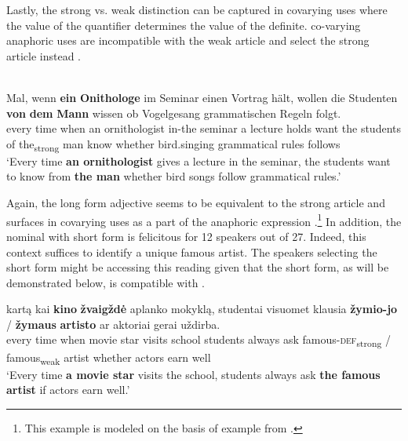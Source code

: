 \documentclass[output=paper,
modfonts
]{langscibook}
\begin{document}
Lastly, the strong vs. weak distinction can be captured in covarying uses where the value of the quantifier determines the value of the definite.  co-varying anaphoric uses are incompatible with the weak article and select the strong article instead . 

\begin{exe}
	\ex \label{ex:sereikaite:43}
	 \citep[33]{Schwarz2009} \\
	 {Mal}, {wenn} {\textbf{ein}} {\textbf{Onithologe}} {im} {Seminar} {einen} {Vortrag} {h\"alt}, {wollen} {die} {Studenten} \textbf{von} \textbf{dem} {\textbf{Mann}} {wissen} {ob} {Vogelgesang} {grammatischen} {Regeln} {folgt}. \\
	every time when {an} {ornithologist} in-the seminar a lecture holds want the students {of} {the\textsubscript{strong}} {man} know whether bird.singing grammatical rules follows\\
	\trans `Every time \textbf{an ornithologist} gives a lecture in the seminar, the students want to know from \textbf{the man} whether bird songs follow grammatical rules.' 
\end{exe}

Again, the long form adjective seems to be equivalent to the  strong article and surfaces in covarying uses as a part of the anaphoric expression .\footnote{This example is modeled on the basis of  example from .} In addition, the nominal with short form is felicitous for 12 speakers out of 27. Indeed, this context suffices to identify a unique famous artist. The speakers selecting the short form might be accessing this reading given that the short form, as will be demonstrated below, is compatible with .


\begin{exe}
	\ex \label{ex:sereikaite:44}
	 {kartą} {kai} \textbf{{kino}} \textbf{{žvaigždė}} {aplanko} {mokyklą}, {studentai} {visuomet} {klausia} \textbf{žymio-jo} \textnormal{/} \textbf{žymaus} \textbf{{artisto}} {ar} {aktoriai} {gerai} {uždirba}. \\
	every time when {movie} {star} visits school students always ask {famous-\textsc{def}\textsubscript{strong}} / {famous}\textsubscript{weak} {artist} whether actors earn well\\
	\trans `Every time \textbf{a movie star} visits the school, students always ask \textbf{the famous artist} if actors earn well.' 
\end{exe}
\end{document}
